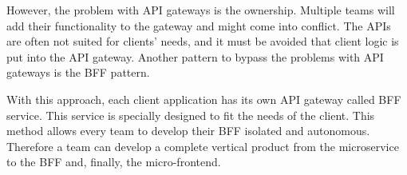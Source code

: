 \bigskip

\noindent However, the problem with \ac{API} gateways is the ownership. Multiple teams will add their functionality to the gateway and might come into conflict. The \acp{API} are often not suited for clients' needs, and it must be avoided that client logic is put into the \ac{API} gateway. Another pattern to bypass the problems with \ac{API} gateways is the \ac{BFF} pattern. \cite[265-266]{book:2018:richardson:background:bff:microservices-patterns}

\bigskip

\noindent With this approach, each client application has its own \ac{API} gateway called \ac{BFF} service. This service is specially designed to fit the needs of the client. \cite[264-266]{book:2018:richardson:background:bff:microservices-patterns} \cite[71-7]{book:2021:newman:background:bff:micro-services} This method allows every team to develop their \ac{BFF} isolated and autonomous. Therefore a team can develop a complete vertical product from the microservice to the \ac{BFF} and, finally, the micro-frontend. \cite{book:2020:geers:background:micro-frontends:micro-frontends-in-action}
